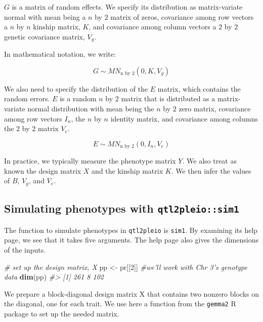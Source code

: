 \documentclass[oneside]{book}\usepackage[]{graphicx}\usepackage[]{color}
\newenvironment{Shaded}{\begin{snugshade}}{\end{snugshade}}
\newcommand{\CommentTok}[1]{\textcolor[rgb]{0.56,0.35,0.01}{\textit{#1}}}
\newcommand{\DecValTok}[1]{\textcolor[rgb]{0.00,0.00,0.81}{#1}}
\newcommand{\KeywordTok}[1]{\textcolor[rgb]{0.13,0.29,0.53}{\textbf{#1}}}
\newcommand{\NormalTok}[1]{#1}
\newcommand{\StringTok}[1]{\textcolor[rgb]{0.31,0.60,0.02}{#1}}
\begin{document}
\(G\) is a matrix of random effects. We specify its distribution as
matrix-variate normal with mean being a \(n\) by \(2\) matrix of zeros,
covariance among row vectors a \(n\) by \(n\) kinship matrix, \(K\), and
covariance among column vectors a \(2\) by \(2\) genetic covariance
matrix, \(V_g\).

In mathematical notation, we write:

\[G \sim MN_{\text{n by 2}}(0, K, V_g)\]

We also need to specify the distribution of the \(E\) matrix, which
contains the random errors. \(E\) is a random \(n\) by \(2\) matrix that
is distributed as a matrix-variate normal distribution with mean being
the \(n\) by \(2\) zero matrix, covariance among row vectors \(I_n\),
the \(n\) by \(n\) identity matrix, and covariance among columns the
\(2\) by \(2\) matrix \(V_e\).

\[E \sim MN_{\text{n by 2}}(0, I_n, V_e)\]

In practice, we typically measure the phenotype matrix \(Y\). We also
treat as known the design matrix \(X\) and the kinship matrix \(K\). We
then infer the values of \(B\), \(V_g\), and \(V_e\).

\hypertarget{simulating-phenotypes-with-qtl2pleiosim1}{%
\subsection{\texorpdfstring{Simulating phenotypes with
\texttt{qtl2pleio::sim1}}{Simulating phenotypes with qtl2pleio::sim1}}\label{simulating-phenotypes-with-qtl2pleiosim1}}

The function to simulate phenotypes in \texttt{qtl2pleio} is
\texttt{sim1}. By examining its help page, we see that it takes five
arguments. The help page also gives the dimensions of the inputs.

\begin{Shaded}
\begin{Highlighting}[]
\CommentTok{# set up the design matrix, X}
\NormalTok{pp <-}\StringTok{ }\NormalTok{pr[[}\DecValTok{2}\NormalTok{]]  }\CommentTok{#we'll work with Chr 3's genotype data}
\KeywordTok{dim}\NormalTok{(pp)}
\CommentTok{#> [1] 261   8 102}
\end{Highlighting}
\end{Shaded}

We prepare a block-diagonal design matrix X that contains two nonzero
blocks on the diagonal, one for each trait. We use here a function from
the \texttt{gemma2} R package to set up the needed matrix.
\end{document}
